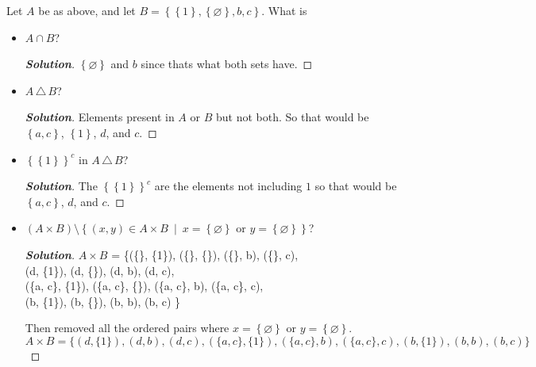 \documentclass[11pt]{article}
\newenvironment{problem}[2][Problem\!]{\begin{trivlist}
\item[\hskip \labelsep {\bfseries #1}\hskip \labelsep {\bfseries #2.}]}{\end{trivlist}}
\newenvironment{solution}{\begin{proof}[\textbf{\textit{Solution}}]}{\end{proof}}
\newcommand{\set}[1]{\left\{#1\right\}} %
\newcommand{\setp}[2]{\left\{#1\ \middle|\ #2\right\}} %
\renewcommand{\emptyset}{\varnothing}
\begin{document}
\begin{problem}{1.2}
Let $A$ be as above, and let $B = \set{\set{1},\set{\emptyset},b,c}$. What is
\begin{itemize}[itemsep=3em]
\item[(a)] $A \cap B$?
\begin{solution}\hfill %
\(\set{\emptyset}\) and \(b\) since thats what both sets have.
\end{solution}

\item[(b)] $A\, \triangle\, B$?
\begin{solution}\hfill %
Elements present in \(A\) or \(B\) but not both. So that would be \(\set{a,c}\), \(\set{1}\), \(d\), and \(c\).
\end{solution}

\item[(c)] $\set{\set{1}}^c$ in $A\, \triangle\, B$?
\begin{solution}\hfill %
The \(\set{\set{1}}^c\) are the elements not including \({{1}}\) so that would be \(\set{a,c}\), \(d\), and \(c\).
\end{solution}

\item[(d)] $(A \times B) \setminus \setp{(x,y) \in A \times B}{x = \set{\emptyset} \text{ or } y = \set{\emptyset}}$?
\begin{solution}\hfill %
\(A \times B\) = \{(\{\emptyset\}, \{1\}), (\{\emptyset\}, \{\emptyset\}), (\{\emptyset\}, b), (\{\emptyset\}, c),
             \\(d, \{1\}), (d, \{\emptyset\}), (d, b), (d, c),
             \\(\{a, c\}, \{1\}), (\{a, c\}, \{\emptyset\}), (\{a, c\}, b), (\{a, c\}, c),
             \\(b, \{1\}), (b, \{\emptyset\}), (b, b), (b, c) \}

             Then removed all the ordered pairs where \(x = \set{\emptyset}\) or \(y = \set{\emptyset}\).
\[A \times B = \{(d, \{1\}), (d, b), (d, c), (\{a, c\}, \{1\}), (\{a, c\}, b), (\{a, c\}, c), (b, \{1\}), (b, b), (b, c) \}\]
\end{solution}

\end{itemize}
\end{problem}
\end{document}
